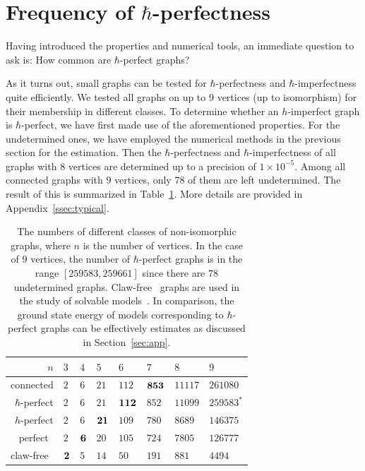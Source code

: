 \documentclass[
12pt,
prx,
aps,
reprint,
a4paper,
longbibliograph,
nofootinbib,
nobibnotes,
superscriptaddress
]{revtex4-2}
\theoremstyle{definition}
\begin{document}
\section{\texorpdfstring{Frequency of $\mathbf{\hbar}$-perfectness}{}}
\label{sec:fre}
Having introduced the properties and numerical tools, an immediate question to ask is: How common are $\hbar$-perfect graphs? 

As it turns out, small graphs can be tested for $\hbar$-perfectness and $\hbar$-imperfectness quite efficiently. 
We tested all graphs on up to 9 vertices (up to isomorphism) for their membership in different classes. 
To determine whether an $h$-imperfect graph is $\hbar$-perfect, we have first made use of the aforementioned properties. For the undetermined ones, we have employed the numerical methods in the previous section for the estimation. 
Then the $\hbar$-perfectness and $\hbar$-imperfectness of all graphs with $8$ vertices are determined up to a precision of $1\times 10^{-5}$. Among all connected graphs with $9$ vertices, only $78$ of them are left undetermined. 
The result of this is summarized in Table~\ref{tab:kinds_ghs}. More details are provided in Appendix~\ref{ssec:typical}.
\begin{table}[h!]
    \centering
        \begin{tabular}{r|l|l|l|l|l|l|l}
    \hline\hline
        $n$ & $3$ & $4$ & $5$ & $6$ & $7$ & $8$ & $9$ \\ \hline
        connected & $2$ & $6$ & $21$ & $112$ & $\bf{853}$ & $11117$ & $261080$ \\ \hline
        $\hbar$-perfect & $2$ & $6$ & $21$ & $\bf{112}$ & $852$ & $11099$ & $259583^*$  \\ \hline
        $h$-perfect & $2$ & $6$ & $\bf{21}$ & $109$ & $780$ & $8689$ & $146375$ \\ \hline
        perfect~\cite{oeis} & $2$ & $\bf{6}$ & $20$ & $105$ & $724$ & $7805$ & $126777$  \\ \hline
	claw-free~\cite{oeis} & $\bf{2}$ & $5$ & $14$ & $50$ & $191$ & $881$ & $4494$ \\ \hline\hline
    \end{tabular}
    \caption{The numbers of different classes of non-isomorphic graphs, where $n$ is the number of vertices. In the case of $9$ vertices, the number of $\hbar$-perfect graphs is in the range $[259583, 259661]$ since there are $78$ undetermined graphs. Claw-free~\cite{faudree1997} graphs are used in the study of solvable models~\cite{chapman2023unified}. In comparison, the ground state energy of models corresponding to $\hbar$-perfect graphs can be effectively estimates as discussed in Section~\ref{sec:app}.
    }
    \label{tab:kinds_ghs}
\end{table}
\end{document}
